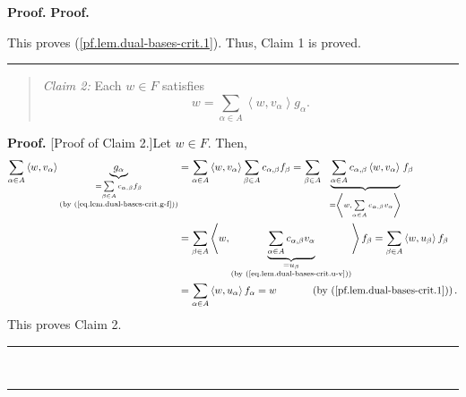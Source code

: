\documentclass[numbers=enddot,12pt,final,onecolumn,notitlepage]{scrartcl}%
\theoremstyle{definition}
\newenvironment{statement}{\begin{quote}}{\end{quote}}
\newenvironment{proof}[1][Proof]{\noindent\textbf{#1.} }{\ \rule{0.5em}{0.5em}}
\let\sumnonlimits\sum
\renewcommand{\sum}{\sumnonlimits\limits}
\newenvironment{verlong}{}{}
\newenvironment{vershort}{}{}
\begin{document}
\begin{proof}
\begin{proof}
\begin{verlong}
\end{verlong}

\noindent This proves (\ref{pf.lem.dual-bases-crit.1}). Thus, Claim 1 is proved.
\end{proof}

\begin{statement}
\textit{Claim 2:} Each $w\in F$ satisfies%
\begin{equation}
w=\sum_{\alpha\in A}\left\langle w,v_{\alpha}\right\rangle g_{\alpha}.
\label{pf.lem.dual-bases-crit.3}%
\end{equation}

\end{statement}

\begin{vershort}


\begin{proof}
[Proof of Claim 2.]Let $w\in F$. Then,
\begin{align*}
\sum_{\alpha\in A}\left\langle w,v_{\alpha}\right\rangle \underbrace{g_{\alpha
}}_{\substack{=\sum_{\beta\in A}c_{\alpha,\beta}f_{\beta}\\\text{(by
(\ref{eq.lem.dual-bases-crit.g-f}))}}}  &  =\sum_{\alpha\in A}\left\langle
w,v_{\alpha}\right\rangle \sum_{\beta\in A}c_{\alpha,\beta}f_{\beta}%
=\sum_{\beta\in A}\ \ \underbrace{\sum_{\alpha\in A}c_{\alpha,\beta
}\left\langle w,v_{\alpha}\right\rangle }_{=\left\langle w,\sum_{\alpha\in
A}c_{\alpha,\beta}v_{\alpha}\right\rangle }f_{\beta}\\
&  =\sum_{\beta\in A}\left\langle w,\underbrace{\sum_{\alpha\in A}%
c_{\alpha,\beta}v_{\alpha}}_{\substack{=u_{\beta}\\\text{(by
(\ref{eq.lem.dual-bases-crit.u-v}))}}}\right\rangle f_{\beta}=\sum_{\beta\in
A}\left\langle w,u_{\beta}\right\rangle f_{\beta}\\
&  =\sum_{\alpha\in A}\left\langle w,u_{\alpha}\right\rangle f_{\alpha
}=w\ \ \ \ \ \ \ \ \ \ \left(  \text{by (\ref{pf.lem.dual-bases-crit.1}%
)}\right)  .
\end{align*}
This proves Claim 2.
\end{proof}
\end{vershort}

\begin{verlong}



\end{verlong}
\end{proof}
\end{document}
